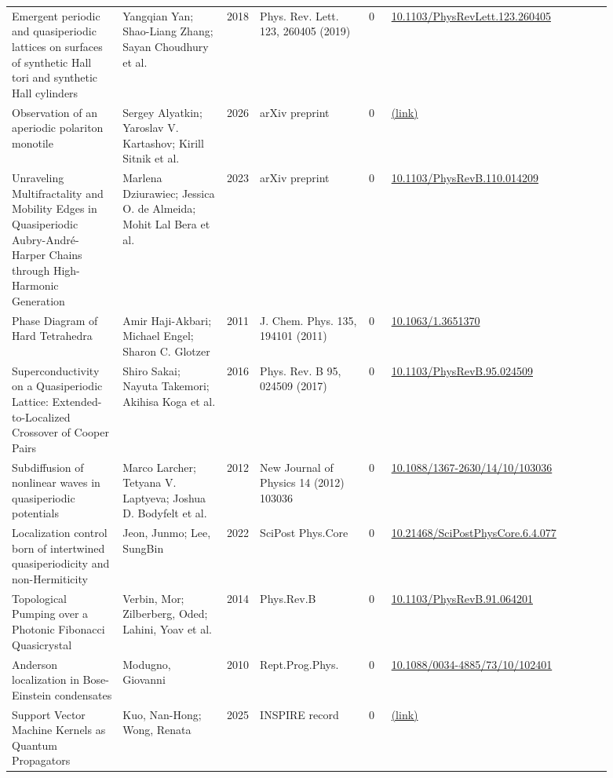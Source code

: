 \documentclass[10pt,a4paper]{article}
\begin{document}
{\begin{longtable}{p{0.192\linewidth}p{0.192\linewidth}p{0.043\linewidth}p{0.192\linewidth}p{0.043\linewidth}p{0.132\linewidth}p{0.096\linewidth}}
Emergent periodic and quasiperiodic lattices on surfaces of synthetic Hall tori and synthetic Hall cylinders & Yangqian Yan; Shao-Liang Zhang; Sayan Choudhury et al. & 2018 & Phys. Rev. Lett. 123, 260405 (2019) & 0 & \href{https://doi.org/10.1103/PhysRevLett.123.260405}{10.1103/PhysRevLett.123.260405} &  \\
Observation of an aperiodic polariton monotile & Sergey Alyatkin; Yaroslav V. Kartashov; Kirill Sitnik et al. & 2026 & arXiv preprint & 0 & \href{http://arxiv.org/abs/2605.13206v1}{(link)} &  \\
Unraveling Multifractality and Mobility Edges in Quasiperiodic Aubry-André-Harper Chains through High-Harmonic Generation & Marlena Dziurawiec; Jessica O. de Almeida; Mohit Lal Bera et al. & 2023 & arXiv preprint & 0 & \href{https://doi.org/10.1103/PhysRevB.110.014209}{10.1103/PhysRevB.110.014209} &  \\
Phase Diagram of Hard Tetrahedra & Amir Haji-Akbari; Michael Engel; Sharon C. Glotzer & 2011 & J. Chem. Phys. 135, 194101 (2011) & 0 & \href{https://doi.org/10.1063/1.3651370}{10.1063/1.3651370} &  \\
Superconductivity on a Quasiperiodic Lattice: Extended-to-Localized Crossover of Cooper Pairs & Shiro Sakai; Nayuta Takemori; Akihisa Koga et al. & 2016 & Phys. Rev. B 95, 024509 (2017) & 0 & \href{https://doi.org/10.1103/PhysRevB.95.024509}{10.1103/PhysRevB.95.024509} &  \\
Subdiffusion of nonlinear waves in quasiperiodic potentials & Marco Larcher; Tetyana V. Laptyeva; Joshua D. Bodyfelt et al. & 2012 & New Journal of Physics 14 (2012) 103036 & 0 & \href{https://doi.org/10.1088/1367-2630/14/10/103036}{10.1088/1367-2630/14/10/103036} &  \\
Localization control born of intertwined quasiperiodicity and non-Hermiticity & Jeon, Junmo; Lee, SungBin & 2022 & SciPost Phys.Core & 0 & \href{https://doi.org/10.21468/SciPostPhysCore.6.4.077}{10.21468/SciPostPhysCore.6.4.077} &  \\
Topological Pumping over a Photonic Fibonacci Quasicrystal & Verbin, Mor; Zilberberg, Oded; Lahini, Yoav et al. & 2014 & Phys.Rev.B & 0 & \href{https://doi.org/10.1103/PhysRevB.91.064201}{10.1103/PhysRevB.91.064201} &  \\
Anderson localization in Bose-Einstein condensates & Modugno, Giovanni & 2010 & Rept.Prog.Phys. & 0 & \href{https://doi.org/10.1088/0034-4885/73/10/102401}{10.1088/0034-4885/73/10/102401} &  \\
Support Vector Machine Kernels as Quantum Propagators & Kuo, Nan-Hong; Wong, Renata & 2025 & INSPIRE record & 0 & \href{https://inspirehep.net/api/literature/2885954?format=json}{(link)} &  \\

\end{longtable}}
\end{document}
